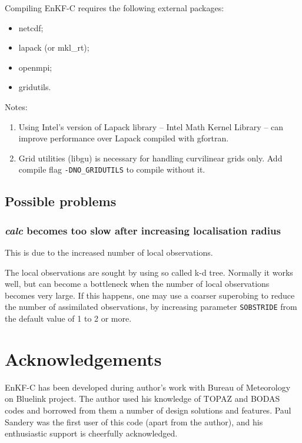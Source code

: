 \documentclass[11pt]{report}
\begin{document}
Compiling EnKF-C requires the following external packages:
\begin{itemize}
\item netcdf;
\item lapack (or mkl\_rt);
\item openmpi;
\item gridutils.
\end{itemize}

Notes:
\vspace{-3mm}
\begin{enumerate}
\item Using Intel's version of Lapack library -- Intel Math Kernel Library -- can improve performance over Lapack compiled with gfortran.
\item Grid  utilities (libgu) is necessary for handling curvilinear grids only.
Add compile flag \verb|-DNO_GRIDUTILS| to compile without it.
\end{enumerate}

\section{Possible problems}

\subsection{\emph{calc} becomes too slow after increasing localisation radius}

This is due to the increased number of local observations.

The local observations are sought by using so called k-d tree.
Normally it works well, but can become a bottleneck when the number of local observations becomes very large.
If this happens, one may use a coarser superobing to reduce the number of assimilated observations, by increasing parameter \verb|SOBSTRIDE| from the default value of 1 to 2 or more.

\chapter*{Acknowledgements}

EnKF-C has been developed during author's work with Bureau of Meteorology on Bluelink project.
The author used his knowledge of TOPAZ \citep{sak12b} and BODAS \citep{oke08b} codes and borrowed from them a number of design solutions and features.
Paul Sandery was the first user of this code (apart from the author), and his enthusiastic support is cheerfully acknowledged.
\end{document}
